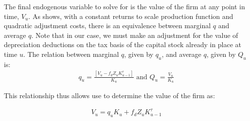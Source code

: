 The final endogenous variable to solve for is the value of the firm at any point in time, $V_{u}$.  As \citet{Hayashi1982} shows, with a constant returns to scale production function and quadratic adjustment costs, there is an equivalence between marginal $q$ and average $q$.  Note that in our case, we must make an adjustment for the value of depreciation deductions on the tax basis of the capital stock already in place at time $u$.  The relation between marginal $q$, given by $q_{u}$, and average $q$, given by $Q_{u}$ is:
 \begin{equation}
\label{eqn:avg_q}
\begin{split}
q_{u}=\frac{[V_{u}-f_{d}Z_{u}K^{\tau}_{u-1}]}{K_{u}} \text{ and } Q_{u}=\frac{V_{u}}{K_{u}}
\end{split}
\end{equation}

\noindent\noindent This relationship thus allows use to determine the value of the firm as:

 \begin{equation}
\label{eqn:solve_firmvalue}
\begin{split}
 V_{u}=q_{u}K_{u}+f_{d}Z_{u}K^{\tau}_{u-1}
\end{split}
\end{equation}



